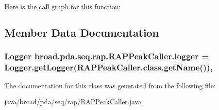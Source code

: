 Here is the call graph for this function\+:




\subsection{Member Data Documentation}
\hypertarget{classbroad_1_1pda_1_1seq_1_1rap_1_1_r_a_p_peak_caller_a5da587cd17e74c8508f897795a604316}{
\subsubsection[{logger}]{\setlength{\rightskip}{0pt plus 5cm}Logger broad.\+pda.\+seq.\+rap.\+R\+A\+P\+Peak\+Caller.\+logger = Logger.\+get\+Logger(R\+A\+P\+Peak\+Caller.\+class.\+get\+Name())\hspace{0.3cm}{\ttfamily [static]}, {\ttfamily [protected]}}}\label{classbroad_1_1pda_1_1seq_1_1rap_1_1_r_a_p_peak_caller_a5da587cd17e74c8508f897795a604316}


The documentation for this class was generated from the following file\+:\begin{DoxyCompactItemize}
\item 
java/broad/pda/seq/rap/\hyperlink{_r_a_p_peak_caller_8java}{R\+A\+P\+Peak\+Caller.\+java}\end{DoxyCompactItemize}
